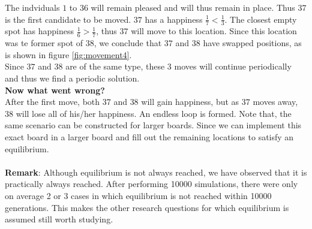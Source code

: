 The indviduals \(1\) to \(36\) will remain pleased and will thus remain in place. 
Thus $37$ is the first candidate to be moved. $37$ has a happiness $\frac{1}{7} < \frac{1}{3}$. 
The closest empty spot has happiness $\frac{1}{6} > \frac{1}{7}$, thus $37$ will move to this location. 
Since this location was te former spot of \(38\), we conclude that  $37$ and $38$ have swapped positions, as is shown in figure \ref{fig:movement4}.\\
Since $37$ and $38$ are of the same type, these $3$ moves will continue periodically and thus we find a periodic solution.\\

\textbf{Now what went wrong?} \\
After the first move, both $37$ and $38$ will gain happiness, but as \(37\) moves away, $38$ will lose all of his/her happiness. 
An endless loop is formed.
Note that, the same scenario can be constructed for larger boards. 
Since we can implement this exact board in a larger board and fill out the remaining locations to satisfy an equilibrium.\\
\\
\textbf{Remark}: Although equilibrium is not always reached, we have observed that it is practically always reached. After performing 10000 simulations, there were only on average 2 or 3 cases in which equilibrium is not reached within 10000 generations. This makes the other research questions for which equilibrium is assumed still worth studying.
